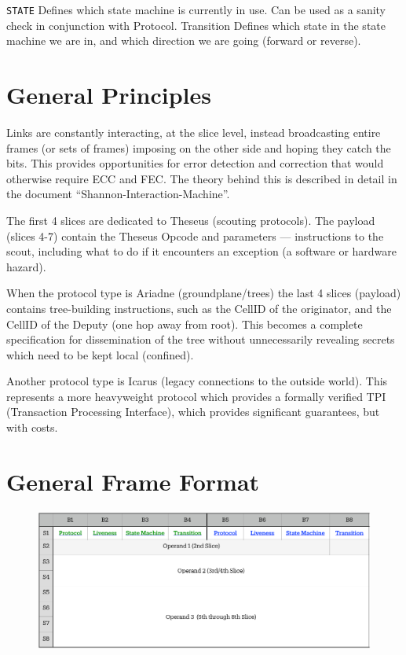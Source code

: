 \documentclass[../HFT-main.tex]{subfiles}
\begin{document}
\texttt{STATE} Defines which state machine is currently in use. Can be used as a sanity check in conjunction with Protocol.
Transition  Defines which state in the state machine we are in, and which direction we are going (forward or reverse).

\section{General Principles}

Links are constantly interacting, at the slice level, instead broadcasting entire frames (or sets of frames) imposing on the other side and hoping they catch the bits. This provides opportunities for error detection and correction that would otherwise require ECC and FEC. The theory behind this is described in detail in the document “Shannon-Interaction-Machine”. 

The first 4 slices are dedicated to Theseus (scouting protocols). The payload (slices 4-7) contain the Theseus Opcode and parameters — instructions to the scout, including what to do if it encounters an exception (a software or hardware hazard).

When the protocol type is Ariadne (groundplane/trees) the last 4 slices (payload) contains tree-building instructions, such as the CellID of the originator, and the CellID of the Deputy (one hop away from root). This becomes a complete specification for dissemination of the tree without unnecessarily revealing secrets which need to be kept local (confined).

Another protocol type is Icarus (legacy connections to the outside world). This represents a more heavyweight protocol which provides a formally verified TPI (Transaction Processing Interface), which provides significant guarantees, but with costs.

\newpage
\section{General Frame Format}

   \begin{figure}
\includegraphics[width=1.5\linewidth]{../figures/General-Frame.pdf}
\end{figure}
\end{document}
